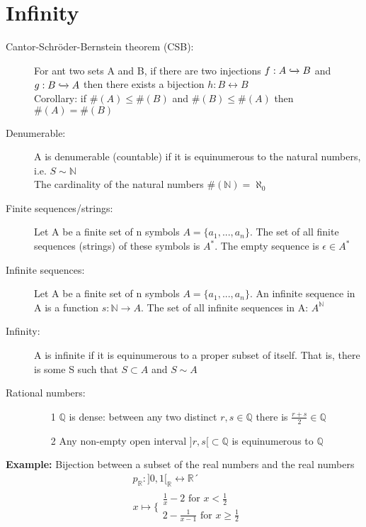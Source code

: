 \documentclass[12pt]{article}
\begin{document}
\section{Infinity}
\begin{description}

\item[Cantor-Schröder-Bernstein theorem (CSB):] For ant two sets A and B, if there are two injections $f: A \xhookrightarrow{} B$ and $g: B \xhookrightarrow{} A$ then there exists a bijection $h: B \longleftrightarrow B$ \\
Corollary: if $\# (A) \leq \# (B)$ and $\# (B) \leq \# (A)$ then $\# (A) = \# (B)$ 

\item[Denumerable:] A is denumerable (countable) if it is equinumerous to the natural numbers, i.e. $S \sim \mathbb{N}$ \\ The cardinality of the natural numbers $\#(\mathbb{N}) =  \aleph_0$

\item[Finite sequences/strings:] Let A be a finite set of n symbols $A = \{a_1,...,a_n\}$. The set of all finite sequences (strings) of these symbols is $A^{*}$. The empty sequence is $\epsilon \in A^{*}$

\item[Infinite sequences:] Let A be a finite set of n symbols $A = \{a_1 , ... ,a_n\}$. An infinite sequence in A is a function $s: \mathbb{N} \rightarrow A$. The set of all infinite sequences in A: $A^\mathbb{N}$ 

\item[Infinity:] A is infinite if it is equinumerous to a proper subset of itself. That is, there is some S such that $S \subset A$ and $S \sim A$


\item[Rational numbers:]  \begin{itemize}
\item [1]$\mathbb{Q}$ is dense: between any two distinct $r,s \in \mathbb{Q}$ there is $\frac{r + s}{2} \in \mathbb{Q}$
\item [2]Any non-empty open interval $]r,s[ \subset \mathbb{Q}$ is equinumerous to $ \mathbb{Q}$
\end{itemize}

\end{description}

\textbf{Example:} Bijection between a subset of the real numbers and the real numbers 
\begin{align*}
& p_{\mathbb{R}}: ]0,1[_{\mathbb{R}} \longleftrightarrow \mathbb{R}´\\
& x \longmapsto \Bigg\{ \begin{array}{c}
\frac{1}{x} - 2 \textrm{ for } x < \frac{1}{2} \\
2 - \frac{1}{x - 1} \textrm{ for } x \geq \frac{1}{2} 
\end{array}
\end{align*}
\end{document}
